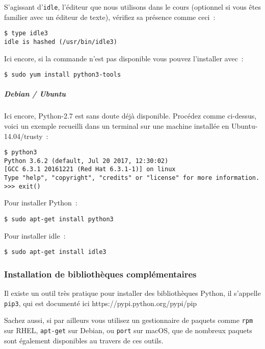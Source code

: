     S'agissant d'\texttt{idle}, l'éditeur que nous utilisons dans le cours
(optionnel si vous êtes familier avec un éditeur de texte), vérifiez sa
présence comme ceci~:

    \begin{verbatim}
$ type idle3
idle is hashed (/usr/bin/idle3)
\end{verbatim}

    Ici encore, si la commande n'est pas disponible vous pouvez l'installer
avec~:

    \begin{verbatim}
$ sudo yum install python3-tools
\end{verbatim}

    \hypertarget{debian-ubuntu}{%
\subparagraph{Debian / Ubuntu}\label{debian-ubuntu}}

    Ici encore, Python-2.7 est sans doute déjà disponible. Procédez comme
ci-dessus, voici un exemple recueilli dans un terminal sur une machine
installée en Ubuntu-14.04/trusty~:

    \begin{verbatim}
$ python3
Python 3.6.2 (default, Jul 20 2017, 12:30:02)
[GCC 6.3.1 20161221 (Red Hat 6.3.1-1)] on linux
Type "help", "copyright", "credits" or "license" for more information.
>>> exit()
\end{verbatim}

    Pour installer Python~:

    \begin{verbatim}
$ sudo apt-get install python3
\end{verbatim}

    Pour installer idle~:

    \begin{verbatim}
$ sudo apt-get install idle3
\end{verbatim}

    \hypertarget{installation-de-bibliothuxe8ques-compluxe9mentaires}{%
\subsubsection{Installation de bibliothèques
complémentaires}\label{installation-de-bibliothuxe8ques-compluxe9mentaires}}

    Il existe un outil très pratique pour installer des bibliothèques
Python, il s'appelle \texttt{pip3}, qui est documenté ici
https://pypi.python.org/pypi/pip

    Sachez aussi, si par ailleurs vous utilisez un gestionnaire de paquets
comme \texttt{rpm} sur RHEL, \texttt{apt-get} sur Debian, ou
\texttt{port} sur macOS, que de nombreux paquets sont également
disponibles au travers de ces outils.

